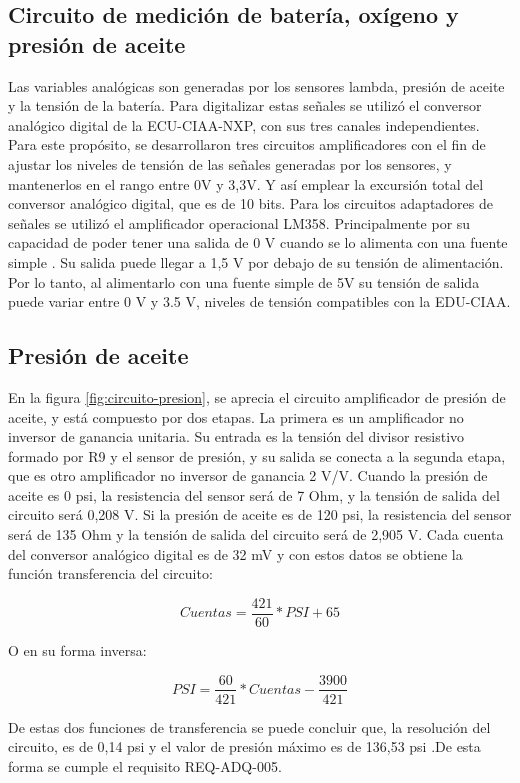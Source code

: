 \subsection{Circuito de medición de batería, oxígeno y presión de aceite}

Las variables analógicas son generadas por los sensores lambda, presión de aceite y la tensión de la batería. Para digitalizar estas señales se utilizó el conversor analógico digital de la ECU-CIAA-NXP, con sus tres canales independientes. Para este propósito, se desarrollaron tres circuitos amplificadores con el fin de ajustar los niveles de tensión de las señales generadas por los sensores, y mantenerlos en el rango entre 0V y 3,3V. Y así emplear la excursión total del conversor analógico digital, que es de 10 bits. Para los circuitos adaptadores de señales se utilizó el amplificador operacional LM358. Principalmente por su capacidad de poder tener una salida de 0 V cuando se lo alimenta con una fuente simple \cite{lm358}. Su salida puede llegar a 1,5 V por debajo de su tensión de alimentación. Por lo tanto, al alimentarlo con una fuente simple de 5V su tensión de salida puede variar entre 0 V y 3.5 V, niveles de tensión compatibles con la EDU-CIAA.

\subsection{Presión de aceite}

En la figura \ref{fig:circuito-presion}, se aprecia el circuito amplificador de presión de aceite, y está compuesto por dos etapas. La primera es un amplificador no inversor de ganancia unitaria. Su entrada es la tensión del divisor resistivo formado por R9 y el sensor de presión, y su salida se conecta a la segunda etapa, que es otro amplificador no inversor de ganancia 2 V/V.
Cuando la presión de aceite es 0 psi, la resistencia del sensor será de 7 Ohm, y la tensión de salida del circuito será 0,208 V. Si la presión de aceite es de 120 psi, la resistencia del sensor será de 135 Ohm y la tensión de salida del circuito será de 2,905 V. Cada cuenta del conversor analógico digital es de 32 mV y con estos datos se obtiene la función transferencia del circuito:

\[ Cuentas = \frac{421}{60} * PSI + 65\]

O en su forma inversa:

\[ PSI = \frac{60}{421} * Cuentas - \frac{3900}{421} \]

De estas dos funciones de transferencia se puede concluir que, la resolución del circuito, es de 0,14 psi y el valor de presión máximo es de 136,53 psi .De esta forma se cumple el requisito REQ-ADQ-005.

